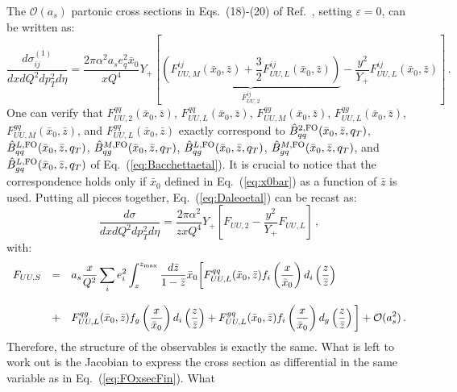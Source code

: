 \documentclass[10pt,a4paper]{article}
\begin{document}
The $\mathcal{O}(a_s)$ partonic cross sections in Eqs.~(18)-(20) of
Ref.~\cite{Daleo:2004pn}, setting $\varepsilon=0$, can be written as:
\begin{equation}
\frac{d\sigma_{ij}^{(1)}}{dxdQ^2d p_T^2 d\eta}=\frac{2\pi \alpha^2 a_s
  e_q^2\bar{x}_0}{x Q^4}Y_+ \left[ \underbrace{\left( F_{UU,M}^{ij}(\bar{x}_0,\bar{z})+\frac{3}{2}F_{UU,L}^{ij}(\bar{x}_0,\bar{z})\right)}_{F_{UU,2}^{ij}} - \frac{y^2}{Y_+}F_{UU,L}^{ij}(\bar{x}_0,\bar{z})\right]\,.
\end{equation}
One can verify that $F_{UU,2}^{qq}(\bar{x}_0,\bar{z})$,
$F_{UU,L}^{qq}(\bar{x}_0,\bar{z})$,
$F_{UU,M}^{qg}(\bar{x}_0,\bar{z})$,
$F_{UU,L}^{qg}(\bar{x}_0,\bar{z})$,
$F_{UU,M}^{gq}(\bar{x}_0,\bar{z})$, and
$F_{UU,L}^{gq}(\bar{x}_0,\bar{z})$ exactly correspond to
$\hat{B}^{2, \rm FO}_{qq}(\bar{x}_0,\bar{z},q_T)$,
$\hat{B}^{L, \rm FO}_{qq}(\bar{x}_0,\bar{z},q_T)$,
$\hat{B}^{M, \rm FO}_{qg}(\bar{x}_0,\bar{z},q_T)$,
$\hat{B}^{L, \rm FO}_{qg}(\bar{x}_0,\bar{z},q_T)$,
$\hat{B}^{M, \rm FO}_{gq}(\bar{x}_0,\bar{z},q_T)$, and
$\hat{B}^{L, \rm FO}_{gq}(\bar{x}_0,\bar{z},q_T)$ of
Eq.~(\ref{eq:Bacchettaetal}). It is crucial to notice that the
correspondence holds only if $\bar{x}_0$ defined in
Eq.~(\ref{eq:x0bar}) as a function of $\bar{z}$ is used.
Putting all pieces together, Eq.~(\ref{eq:Daleoetal}) can be recast as:
\begin{equation}
\frac{d\sigma}{dxdQ^2d p_T^2 d\eta} = \frac{2\pi \alpha^2
  }{z x Q^4}Y_+ \left[F_{UU,2} - \frac{y^2}{Y_+}F_{UU,L}\right]\,,
\end{equation}
with:
\begin{equation}
\begin{array}{rcl}
  F_{UU,S}&=&\displaystyle 
  a_s\frac{x }{Q^2}\sum_{i}e_i^2\int_z^{z_{\rm max}}
              \frac{d\bar{z}}{1-\bar{z}}\bar{x}_0\bigg[F^{qq}_{UU,L}(\bar{x}_0,\bar{z})f_i\left(\frac{x}{\bar{x}_0}\right)
              d_i\left(\frac{z}{\bar{z}}\right)\\
\\
&+&\displaystyle F^{qg}_{UU, L}(\bar{x}_0,\bar{z})f_g\left(\frac{x}{\bar{x}_0}\right)
              d_i\left(\frac{z}{\bar{z}}\right)+ F^{gq}_{UU, L}(\bar{x}_0,\bar{z})f_i\left(\frac{x}{\bar{x}_0}\right)
              d_g\left(\frac{z}{\bar{z}}\right)\bigg]
+\mathcal{O}(a_s^2)\,.
\end{array}
\end{equation}
Therefore, the structure of the observables is exactly the same. What
is left to work out is the Jacobian to express the cross section as
differential in the same variable as in Eq.~(\ref{eq:FOxsecFin}). What
\end{document}
